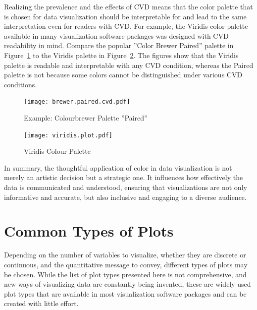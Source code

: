 Realizing the prevalence and the effects of CVD means that the color palette that is chosen for data visualization should be interpretable for and lead to the same interpretation even for readers with CVD. For example, the Viridis color palette available in many visualization software packages was designed with CVD readability in mind. Compare the popular ''Color Brewer Paired'' palette in Figure~\ref{fig:paired} to the Viridis palette in Figure~\ref{fig:viridis}. The figures show that the Viridis palette is readable and interpretable with any CVD condition, whereas the Paired palette is not because some colors cannot be distinguished under various CVD conditions.

\begin{figure}
\centering
  \texttt{[image: brewer.paired.cvd.pdf]}

\caption{Example: Colourbrewer Palette ''Paired''}
\label{fig:paired}
\end{figure}

\begin{figure}
\centering
  \texttt{[image: viridis.plot.pdf]}

\caption{Viridis Colour Palette}
\label{fig:viridis}
\end{figure}

In summary, the thoughtful application of color in data visualization is not merely an artistic decision but a strategic one. It influences how effectively the data is communicated and understood, ensuring that visualizations are not only informative and accurate, but also inclusive and engaging to a diverse audience.

\FloatBarrier

\section{Common Types of Plots}

Depending on the number of variables to visualize, whether they are discrete or continuous, and the quantitative message to convey, different types of plots may be chosen. While the list of plot types presented here is not comprehensive, and new ways of visualizing data are constantly being invented, these are widely used plot types that are available in most visualization software packages and can be created with little effort.

